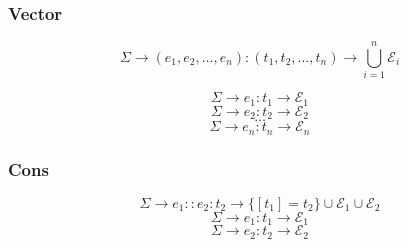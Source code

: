 \documentclass[titlepage]{article}
\begin{document}
\newpage

\subsubsection{Vector}

$$\Sigma \rightarrow (e_1, e_2, \dots, e_n) : (t_1, t_2, \dots, t_n) \rightarrow \bigcup_{i = 1} ^ n \mathcal{E}_i$$
\noindent\makebox[\linewidth]{\rule{3.15in}{0.4pt}}

$$\Sigma \rightarrow e_1 : t_1 \rightarrow \mathcal{E}_1$$
$$\Sigma \rightarrow e_2 : t_2 \rightarrow \mathcal{E}_2$$
$$\dots$$
$$\Sigma \rightarrow e_n : t_n \rightarrow \mathcal{E}_n$$

\subsubsection{Cons}

$$\Sigma \rightarrow e_1 :: e_2 : t_2 \rightarrow \{[t_1] = t_2\} \cup \mathcal{E}_1 \cup \mathcal{E}_2$$
\noindent\makebox[\linewidth]{\rule{2.8in}{0.4pt}}
$$\Sigma \rightarrow e_1 : t_1 \rightarrow \mathcal{E}_1$$
$$\Sigma \rightarrow e_2 : t_2 \rightarrow \mathcal{E}_2$$
\end{document}
